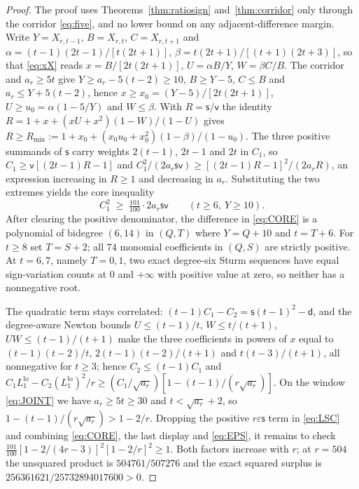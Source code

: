\documentclass[11pt,a4paper]{article}
\theoremstyle{plain}
\theoremstyle{definition}
\theoremstyle{remark}
\newcommand{\ls}{\mathsf{s}}
\newcommand{\lv}{\mathsf{v}}
\newcommand{\ld}{\mathsf{d}}
\begin{document}
\begin{proof}
The proof uses Theorems~\ref{thm:ratiosign} and~\ref{thm:corridor} only through
the corridor \eqref{eq:five}, and no lower bound on any adjacent-difference
margin. Write $Y=X_{r,t-1}$, $B=X_{r,t}$, $C=X_{r,t+1}$ and
$\alpha=(t-1)(2t-1)/[t(2t+1)]$, $\beta=t(2t+1)/[(t+1)(2t+3)]$, so that
\eqref{eq:xX} reads $x=B/[2t(2t+1)]$, $U=\alpha B/Y$, $W=\beta C/B$. The
corridor and $a_r\ge5t$ give $Y\ge a_r-5(t-2)\ge10$, $B\ge Y-5$, $C\le B$ and
$a_r\le Y+5(t-2)$, hence
$x\ge x_0=(Y-5)/[2t(2t+1)]$, $U\ge u_0=\alpha(1-5/Y)$ and $W\le\beta$. With
$R=\ls/\lv$ the identity $R=1+x+(xU+x^2)(1-W)/(1-U)$ gives
$R\ge R_{\min}:=1+x_0+(x_0u_0+x_0^2)(1-\beta)/(1-u_0)$. The three positive summands
of $\ls$ carry weights $2(t-1)$, $2t-1$ and $2t$ in $C_1$, so
$C_1\ge\lv[(2t-1)R-1]$ and $C_1^2/(2a_r\ls\lv)\ge[(2t-1)R-1]^2/(2a_rR)$, an
expression increasing in $R\ge1$ and decreasing in $a_r$. Substituting the two
extremes yields the core inequality
\begin{equation}\label{eq:CORE}
  C_1^2\;\ge\;\tfrac{101}{100}\cdot2a_r\ls\lv
  \qquad(t\ge6,\ Y\ge10).
\end{equation}
After clearing the positive denominator, the difference in \eqref{eq:CORE} is a
polynomial of bidegree $(6,14)$ in $(Q,T)$ where $Y=Q+10$ and $t=T+6$.
For $t\ge8$ set $T=S+2$; all $74$ monomial coefficients in $(Q,S)$ are strictly
positive. At $t=6,7$, namely $T=0,1$, two exact degree-six Sturm sequences have
equal sign-variation counts at $0$ and $+\infty$ with positive value at zero,
so neither has a nonnegative root.

The quadratic term stays correlated: $(t-1)C_1-C_2=\ls(t-1)^2-\ld$, and the
degree-aware Newton bounds $U\le(t-1)/t$, $W\le t/(t+1)$, $UW\le(t-1)/(t+1)$
make the three coefficients in powers of $x$ equal to $(t-1)(t-2)/t$,
$2(t-1)(t-2)/(t+1)$ and $t(t-3)/(t+1)$, all nonnegative for $t\ge3$; hence
$C_2\le(t-1)C_1$ and
$C_1L_1^{\mathrm{lo}}-C_2(L_1^{\mathrm{lo}})^2/r\ge
(C_1/\sqrt{a_r})[1-(t-1)/(r\sqrt{a_r})]$. On the window \eqref{eq:JOINT} we have
$a_r\ge5t\ge30$ and $t<\sqrt{a_r}+2$, so $1-(t-1)/(r\sqrt{a_r})>1-2/r$.
Dropping the positive $r\varepsilon\ls$ term in \eqref{eq:LSC} and combining
\eqref{eq:CORE}, the last display and \eqref{eq:EPS}, it remains to check
$\tfrac{101}{100}[1-2/(4r-3)]^2[1-2/r]^2\ge1$. Both factors increase with $r$;
at $r=504$ the unsquared product is $504761/507276$ and the exact squared
surplus is $256361621/25732894017600>0$.
\end{proof}
\end{document}
